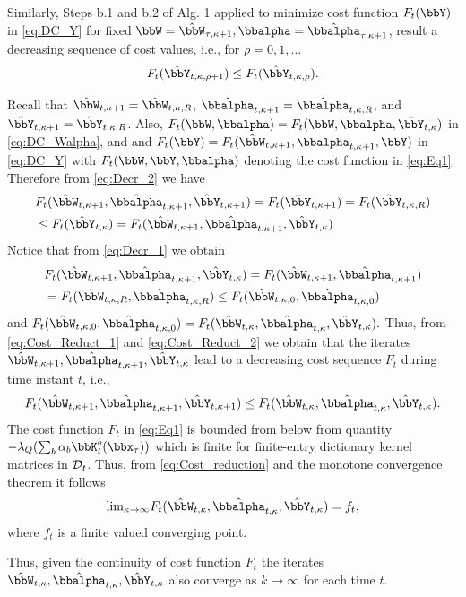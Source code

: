 \documentclass[10pt,final]{IEEEtran}
\begin{document}
Similarly, Steps b.1 and b.2 of Alg. 1  applied to minimize  cost function $F_t(\bbY)$ in \eqref{eq:DC_Y} for fixed $\bbW=\hat{\bbW}_{\tau,\kappa+1}, \bbalpha=\hat{\bbalpha}_{\tau,\kappa+1}$,  result a decreasing sequence of cost values, i.e., for $\rho=0,1,\ldots$
\begin{align}\label{eq:Decr_2}
F_t(\hat{\bbY}_{t,\kappa,\rho+1}) \leq 
F_t(\hat{\bbY}_{t,\kappa,\rho}). 
\end{align}

Recall that $\hat{\bbW}_{t,\kappa+1}=\hat{\bbW}_{t,\kappa,R}$, $\hat{\bbalpha}_{t,\kappa+1}=\hat{\bbalpha}_{t,\kappa,R}$, and  $\hat{\bbY}_{t,\kappa+1}=\hat{\bbY}_{t,\kappa,R}$. 
Also, $F_t(\bbW,\bbalpha)=F_t(\bbW,\bbalpha,\hat{\bbY}_{t,\kappa})$ in \eqref{eq:DC_Walpha}, and 
and $F_t(\bbY)=F_t(\hat{\bbW}_{t,\kappa+1},\bbalpha_{t,\kappa+1},{\bbY})$ in \eqref{eq:DC_Y} with $F_t(\bbW,\bbY,\bbalpha)$ denoting the cost function in \eqref{eq:Eq1}.
Therefore from \eqref{eq:Decr_2} we have
\begin{align}\label{eq:Cost_Reduct_1}
    &F_t(\hat{\bbW}_{t,\kappa+1},\hat{\bbalpha}_{t,\kappa+1},\hat{\bbY}_{t,\kappa+1})=F_t(\hat{\bbY}_{t,\kappa+1})=F_t(\hat{\bbY}_{t,\kappa,R}) \nonumber\\
    &\leq F_t(\hat{\bbY}_{t,\kappa})=F_t(\hat{\bbW}_{t,\kappa+1},\hat{\bbalpha}_{t,\kappa+1},\hat{{\bbY}}_{t,\kappa})
\end{align}
Notice that  from \eqref{eq:Decr_1} we obtain
\begin{align}\label{eq:Cost_Reduct_2}
 & F_t(\hat{\bbW}_{t,\kappa+1},\hat{\bbalpha}_{t,\kappa+1},\hat{{\bbY}}_{t,\kappa})=F_t(\hat{\bbW}_{t,\kappa+1},\hat{\bbalpha}_{t,\kappa+1})\nonumber\\
  &=F_t(\hat{\bbW}_{t,\kappa,R},\hat{\bbalpha}_{t,\kappa,R})
  \leq F_t(\hat{\bbW}_{t,\kappa,0},\hat{\bbalpha}_{t,\kappa,0})
\end{align}
and $F_t(\hat{\bbW}_{t,\kappa,0},\hat{\bbalpha}_{t,\kappa,0})=
  F_t(\hat{\bbW}_{t,\kappa},\hat{\bbalpha}_{t,\kappa},\hat{{\bbY}}_{t,\kappa}).$
Thus, from \eqref{eq:Cost_Reduct_1} and \eqref{eq:Cost_Reduct_2} we obtain
that the iterates $\hat{\bbW}_{t,\kappa+1},\hat{\bbalpha}_{t,\kappa+1},\hat{{\bbY}}_{t,\kappa}$ lead to a decreasing cost sequence $F_t$ during time instant $t$, i.e.,
\begin{align}\label{eq:Cost_reduction}
F_t(\hat{\bbW}_{t,\kappa+1},\hat{\bbalpha}_{t,\kappa+1},\hat{\bbY}_{t,\kappa+1})\leq F_t(\hat{\bbW}_{t,\kappa},\hat{\bbalpha}_{t,\kappa},\hat{{\bbY}}_{t,\kappa}).
\end{align}
The cost function $F_t$ in \eqref{eq:Eq1} is bounded from below from quantity $-\lambda_{Q}(\sum_b\alpha_b\bbK_{t}^b(\bbx_{\tau}))$ which is finite for finite-entry dictionary kernel matrices in ${\cal D}_t$. Thus, from \eqref{eq:Cost_reduction} and the monotone convergence theorem it follows
\begin{equation}\label{eq:Lim_1}
\textrm{lim}_{\kappa\rightarrow\infty}F_t (\hat{\bbW}_{t,\kappa},\hat{\bbalpha}_{t,\kappa},\hat{{\bbY}}_{t,\kappa})=f_{t},
\end{equation}
where $f_{t}$ is a finite valued converging point.

Thus, given the continuity of cost function $F_t$ the iterates 
$\hat{\bbW}_{t,\kappa},\hat{\bbalpha}_{t,\kappa},\hat{{\bbY}}_{t,\kappa}$ also converge as $k\rightarrow\infty$ for each time  $t$.
\myQED
\end{document}
